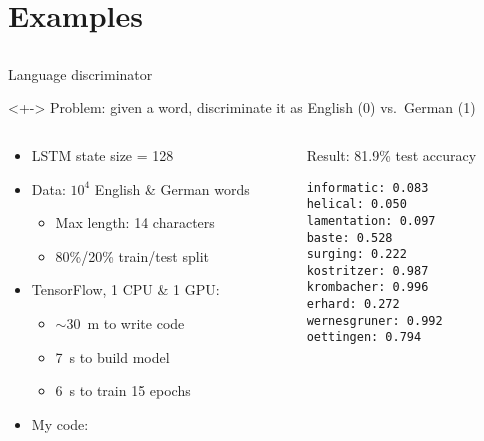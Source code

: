 \section{Examples}
\subsection{}

\begin{frame}[fragile]{Language discriminator}
    \begin{block}{}<+->
        Problem: given a word, discriminate it as English (0) vs.\ German (1)
    \end{block}

    \centering
    

    \begin{columns}
        \begin{column}{0.61\textwidth}
            \vspace{-5mm}
            \begin{itemize}
                \item LSTM state size = 128
                \pause
                \item Data: $10^4$ English \& German words
                \begin{itemize}
                    \item Max length: 14 characters
                    \item 80\%/20\% train/test split
                \end{itemize}
                \pause
                \item TensorFlow, 1 CPU \& 1 GPU:
                \begin{itemize}
                    \item $\sim$30~m to write code
                    \item 7~s to build model
                    \item 6~s to train 15 epochs
                \end{itemize}
                \item My code: 
            \end{itemize}
        \end{column}
        \begin{column}{0.39\textwidth}
            \pause
            Result: 81.9\% test accuracy
            \vspace{-17pt}
            \footnotesize
\begin{verbatim}
informatic: 0.083
helical: 0.050
lamentation: 0.097
baste: 0.528
surging: 0.222
kostritzer: 0.987
krombacher: 0.996
erhard: 0.272
wernesgruner: 0.992
oettingen: 0.794
\end{verbatim}
        \end{column}
    \end{columns}
\end{frame}

